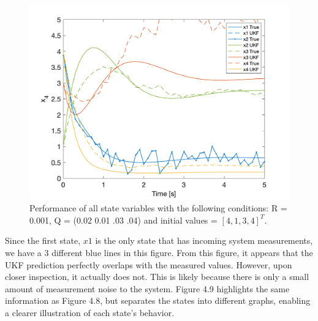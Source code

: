 \begin{figure}[h]
    \centering
    \includegraphics[scale = 0.6]{Meskin_overall.png}
    \caption{Performance of all state variables with the following conditions: R = 0.001, Q = (0.02 0.01 .03 .04) and initial values = $[4, 1, 3, 4]^T$.}
\end{figure}

\noindent Since the first state, $x1$ is the only state that has incoming system measurements, we have a 3 different blue lines in this figure. From this figure, it appears that the UKF prediction perfectly overlaps with the measured values. However, upon closer inspection, it actually does not. This is likely because there is only a small amount of measurement noise to the system. Figure 4.9 highlights the same information as Figure 4.8, but separates the states into different graphs, enabling a clearer illustration of each state's behavior.

